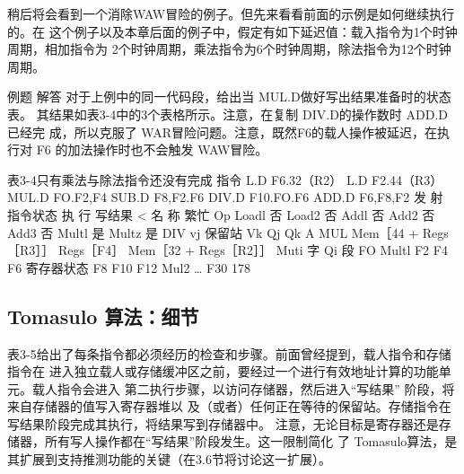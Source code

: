 稍后将会看到一个消除WAW冒险的例子。但先来看看前面的示例是如何继续执行的。在
这个例子以及本章后面的例子中，假定有如下延迟值：载入指令为1个时钟周期，相加指令为
2个时钟周期，乘法指令为6个时钟周期，除法指令为12个时钟周期。

例题
解答
对于上例中的同一代码段，给出当 MUL.D做好写出结果准备时的状态表。
其结果如表3-4中的3个表格所示。注意，在复制 DIV.D的操作数时 ADD.D已经完
成，所以克服了 WAR冒险问题。注意，既然F6的载人操作被延迟，在执行对 F6
的加法操作时也不会触发 WAW冒险。

表3-4只有乘法与除法指令还没有完成
指令
L.D
F6.32（R2）
L.D
F2.44（R3）
MUL.D FO.F2,F4
SUB.D F8,F2.F6
DIV.D F10.FO.F6
ADD.D F6,F8,F2
发
射
指令状态
执
行
写结果
<
名
称
繁忙
Op
Loadl
否
Load2
否
Addl
否
Add2
否
Add3
否
Multl
是
Multz
是
DIV
vj
保留站
Vk
Qj
Qk
A
MUL Mem［44 + Regs［R3］］
Regs［F4］
Mem［32 + Regs［R2］］ Muti
字
Qi
段
FO
Multl
F2
F4
F6
寄存器状态
F8
F10
F12
Mul2
…
F30
178
\subsection{Tomasulo 算法：细节}
表3-5给出了每条指令都必须经历的检查和步骤。前面曾经提到，载人指令和存储指令在
进入独立载人或存储缓冲区之前，要经过一个进行有效地址计算的功能单元。载人指令会进入
第二执行步骤，以访问存储器，然后进入“写结果” 阶段，将来自存储器的值写入寄存器堆以
及（或者）任何正在等待的保留站。存储指令在写结果阶段完成其执行，将结果写到存储器中。
注意，无论目标是寄存器还是存储器，所有写人操作都在“写结果”阶段发生。这一限制简化
了 Tomasulo算法，是其扩展到支持推测功能的关键（在3.6节将讨论这一扩展）。

